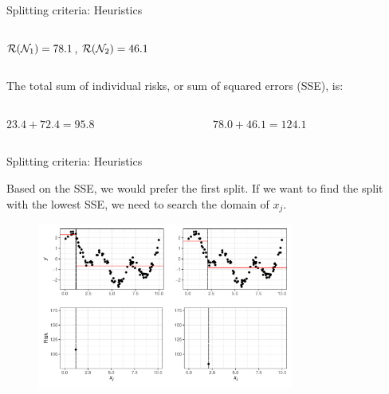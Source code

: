 \documentclass[11pt,compress,t,notes=noshow, xcolor=table]{beamer}
\begin{document}
\begin{vbframe}{Splitting criteria: Heuristics}
\begin{columns}
\begin{column}{0.5\textwidth}
$\mathcal{R}(\mathcal{N}_1) = 78.1$, $\mathcal{R}(\mathcal{N}_2) = 46.1$

\end{column}
\end{columns}
\vspace{0.1in}

The total sum of individual risks, or sum of squared errors (SSE), is:
\vspace{0.1in}

\begin{columns}
\begin{column}{0.5\textwidth}
$23.4 + 72.4 = 95.8$
\end{column}

\begin{column}{0.5\textwidth}
$78.0 + 46.1 = 124.1$ 
\end{column}
\end{columns}

\end{vbframe}

\begin{vbframe}{Splitting criteria: Heuristics}

Based on the SSE, we would prefer the first split.
If we want to find the split with the lowest SSE, we need to search the domain of $x_j$.

\begin{figure}
\includegraphics[width=0.75\textwidth]{figure/splitcrit_optimal-constant-grid.pdf} 
\end{figure}


\end{vbframe}
\end{document}
